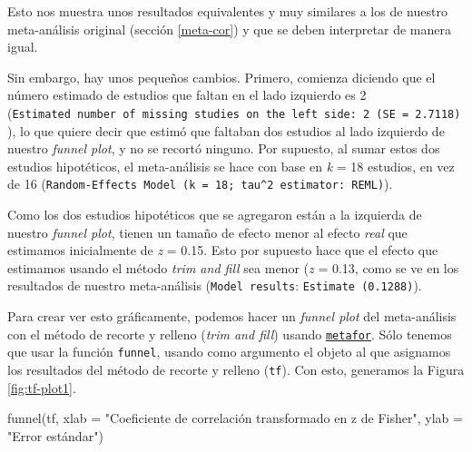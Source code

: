 \documentclass[
  bookmarksnumbered]{article}
\newenvironment{Shaded}{\begin{snugshade}}{\end{snugshade}}
\newcommand{\AttributeTok}[1]{\textcolor[rgb]{0.00,0.34,0.68}{#1}}
\newcommand{\FunctionTok}[1]{\textcolor[rgb]{0.39,0.29,0.61}{#1}}
\newcommand{\NormalTok}[1]{\textcolor[rgb]{0.12,0.11,0.11}{#1}}
\newcommand{\StringTok}[1]{\textcolor[rgb]{0.75,0.01,0.01}{#1}}
\begin{document}
Esto nos muestra unos resultados equivalentes y muy similares a los de nuestro meta-análisis original (sección \ref{meta-cor}) y que se deben interpretar de manera igual.

Sin embargo, hay unos pequeños cambios. Primero, comienza diciendo que el número estimado de estudios que faltan en el lado izquierdo es 2 (\texttt{Estimated\ number\ of\ missing\ studies\ on\ the\ left\ side:\ 2\ (SE\ =\ 2.7118)}), lo que quiere decir que estimó que faltaban dos estudios al lado izquierdo de nuestro \emph{funnel plot}, y no se recortó ninguno. Por supuesto, al sumar estos dos estudios hipotéticos, el meta-análisis se hace con base en \emph{k} = 18 estudios, en vez de 16 (\texttt{Random-Effects\ Model\ (k\ =\ 18;\ tau\^{}2\ estimator:\ REML)}).

Como los dos estudios hipotéticos que se agregaron están a la izquierda de nuestro \emph{funnel plot}, tienen un tamaño de efecto menor al efecto \emph{real} que estimamos inicialmente de \emph{z} = 0.15. Esto por supuesto hace que el efecto que estimamos usando el método \emph{trim and fill} sea menor (\emph{z} = 0.13, como se ve en los resultados de nuestro meta-análisis (\texttt{Model\ results}: \texttt{Estimate\ (0.1288)}).

Para crear ver esto gráficamente, podemos hacer un \emph{funnel plot} del meta-análisis con el método de recorte y relleno (\emph{trim and fill}) usando \href{https://www.metafor-project.org/doku.php}{\texttt{metafor}}. Sólo tenemos que usar la función \texttt{funnel}, usando
como argumento el objeto al que asignamos los resultados del método de recorte y relleno (\texttt{tf}). Con esto, generamos la Figura \ref{fig:tf-plot1}.

\begin{Shaded}
\begin{Highlighting}[]
\FunctionTok{funnel}\NormalTok{(tf, }
       \AttributeTok{xlab =} \StringTok{"Coeficiente de correlación transformado en z de Fisher"}\NormalTok{,}
       \AttributeTok{ylab =} \StringTok{"Error estándar"}\NormalTok{)}
\end{Highlighting}
\end{Shaded}
\end{document}
